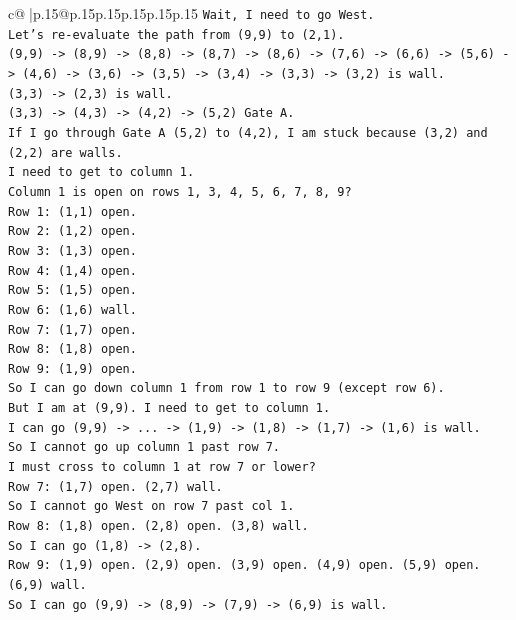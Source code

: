 \documentclass{article}
\begin{document}
{\begin{supertabular}{c@{$\;$}|p{.15\linewidth}@{}p{.15\linewidth}p{.15\linewidth}p{.15\linewidth}p{.15\linewidth}p{.15\linewidth}}
{{{\texttt{Wait, I need to go West.} \\
\texttt{Let's re{-}evaluate the path from (9,9) to (2,1).} \\
\texttt{(9,9) {-}> (8,9) {-}> (8,8) {-}> (8,7) {-}> (8,6) {-}> (7,6) {-}> (6,6) {-}> (5,6) {-}> (4,6) {-}> (3,6) {-}> (3,5) {-}> (3,4) {-}> (3,3) {-}> (3,2) is wall.} \\
\texttt{(3,3) {-}> (2,3) is wall.} \\
\texttt{(3,3) {-}> (4,3) {-}> (4,2) {-}> (5,2) Gate A.} \\
\texttt{If I go through Gate A (5,2) to (4,2), I am stuck because (3,2) and (2,2) are walls.} \\
\texttt{I need to get to column 1.} \\
\texttt{Column 1 is open on rows 1, 3, 4, 5, 6, 7, 8, 9?} \\
\texttt{Row 1: (1,1) open.} \\
\texttt{Row 2: (1,2) open.} \\
\texttt{Row 3: (1,3) open.} \\
\texttt{Row 4: (1,4) open.} \\
\texttt{Row 5: (1,5) open.} \\
\texttt{Row 6: (1,6) wall.} \\
\texttt{Row 7: (1,7) open.} \\
\texttt{Row 8: (1,8) open.} \\
\texttt{Row 9: (1,9) open.} \\
\texttt{So I can go down column 1 from row 1 to row 9 (except row 6).} \\
\texttt{But I am at (9,9). I need to get to column 1.} \\
\texttt{I can go (9,9) {-}> ... {-}> (1,9) {-}> (1,8) {-}> (1,7) {-}> (1,6) is wall.} \\
\texttt{So I cannot go up column 1 past row 7.} \\
\texttt{I must cross to column 1 at row 7 or lower?} \\
\texttt{Row 7: (1,7) open. (2,7) wall.} \\
\texttt{So I cannot go West on row 7 past col 1.} \\
\texttt{Row 8: (1,8) open. (2,8) open. (3,8) wall.} \\
\texttt{So I can go (1,8) {-}> (2,8).} \\
\texttt{Row 9: (1,9) open. (2,9) open. (3,9) open. (4,9) open. (5,9) open. (6,9) wall.} \\
\texttt{So I can go (9,9) {-}> (8,9) {-}> (7,9) {-}> (6,9) is wall.} \\
}}}
\end{supertabular}}
\end{document}
